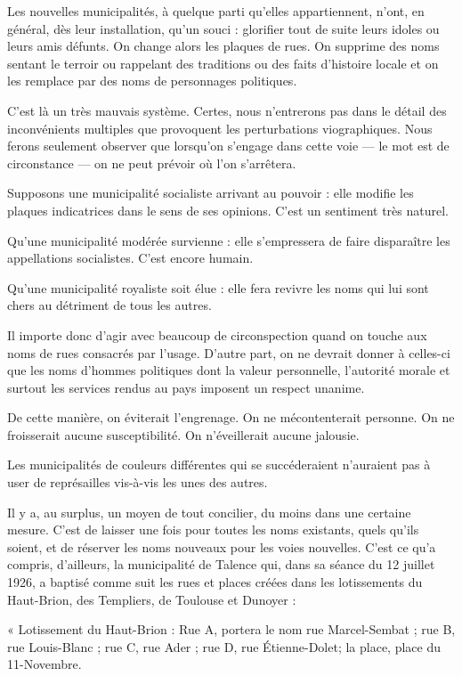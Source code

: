 \documentclass[a4paper,11pt]{book}
\begin{document}
Les nouvelles municipalités, à quelque parti qu'elles appartiennent, n'ont, en général, dès leur installation, qu'un souci : glorifier tout de suite leurs idoles ou leurs amis défunts. On change alors les plaques de rues. On supprime des noms sentant le terroir ou rappelant des traditions ou des faits d'histoire locale et on les remplace par des noms de personnages politiques.

C'est là un très mauvais système. Certes, nous n'entrerons pas dans le détail des inconvénients multiples que provoquent les perturbations viographiques. Nous ferons seulement observer que lorsqu'on s'engage dans cette voie — le mot est de circonstance — on ne peut prévoir où l'on s'arrêtera.

Supposons une municipalité socialiste arrivant au pouvoir : elle modifie les plaques indicatrices dans le sens de ses opinions. C'est un sentiment très naturel.

Qu'une municipalité modérée survienne : elle s'empressera de faire disparaître les appellations socialistes. C'est encore humain.

Qu'une municipalité royaliste soit élue : elle fera revivre les noms qui lui sont chers au détriment de tous les autres.

Il importe donc d'agir avec beaucoup de circonspection quand on touche aux noms de rues consacrés par l'usage. D'autre part, on ne devrait donner à celles-ci que les noms
d'hommes politiques dont la valeur personnelle, l'autorité morale et surtout les services rendus au pays imposent un respect unanime.

De cette manière, on éviterait l'engrenage. On ne mécontenterait personne. On ne froisserait aucune susceptibilité. On n'éveillerait aucune jalousie.

Les municipalités de couleurs différentes qui se succéderaient n'auraient pas à user de représailles vis-à-vis les unes des autres.

Il y a, au surplus, un moyen de tout concilier, du moins dans une certaine mesure. C'est de laisser une fois pour toutes les noms existants, quels qu'ils soient, et de réserver les noms nouveaux pour les voies nouvelles. C'est ce qu'a compris, d'ailleurs, la municipalité de Talence qui, dans sa séance du 12 juillet 1926, a baptisé comme suit les rues et places créées dans les lotissements du Haut-Brion, des Templiers, de Toulouse et Dunoyer : 

« Lotissement du Haut-Brion : Rue A, portera le nom rue Marcel-Sembat ; rue B, rue Louis-Blanc ; rue C, rue Ader ; rue D, rue Étienne-Dolet; la place, place du 11-Novembre.
\end{document}
